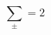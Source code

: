 \documentclass{article}
\begin{document}
\begin{equation} \sum_{\pm} = 2 \end{equation}
\end{document}
